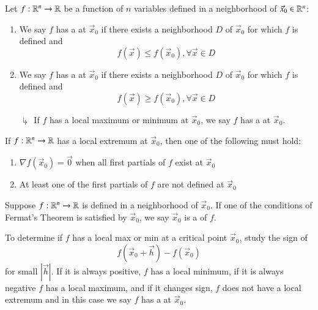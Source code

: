 \begin{appendices}
    \begin{defn}
        Let $f:\mathbb R^n\rightarrow \mathbb R$ be a function of $n$ variables defined in a neighborhood of $\vec{x}_0 \in \mathbb R^n$: \begin{enumerate}
            \item We say $f$ has a  at $\vec{x}_0$ if there exists a neighborhood $D$ of $\vec{x}_0$ for which $f$ is defined and \begin{equation}
                f(\vec{x}) \leq f(\vec{x}_0), \forall \vec{x} \in D
            \end{equation}
            \item We say $f$ has a  at $\vec{x}_0$ if there exists a neighborhood $D$ of $\vec{x}_0$ for which $f$ is defined and \begin{equation}
                f(\vec{x}) \geq f(\vec{x}_0), \forall \vec{x} \in D
            \end{equation}
            \item[$\drsh$] If $f$ has a local maximum or minimum at $\vec{x}_0$, we say $f$ has a  at $\vec{x}_0$.
        \end{enumerate}
    \end{defn}
    
    \begin{thm}[Fermat]
        If $f:\mathbb R^n\rightarrow \mathbb R$ has a local extremum at $\vec{x}_0$, then one of the following must hold:\begin{enumerate}
            \item $\nabla f(\vec{x}_0) = \vec{0}$ when all first partials of $f$ exist at $\vec{x}_0$
            \item At least one of the first partials of $f$ are not defined at $\vec{x}_0$
        \end{enumerate}
    \end{thm}
    
    \begin{defn}
        Suppose $f:\mathbb R^n\rightarrow \mathbb R$ is defined in a neighborhood of $\vec{x}_0$. If one of the conditions of Fermat's Theorem is satisfied by $\vec{x}_0$, we say $\vec{x}_0$ is a  of $f$.
    \end{defn}
    
    \begin{rmk}
        To determine if $f$ has a local max or min at a critical point $\vec{x}_0$, study the sign of \begin{equation}
            f(\vec{x}_0 + \vec{h}) - f(\vec{x}_0)
        \end{equation}
        for small $|\vec{h}|$. If it is always positive, $f$ has a local minimum, if it is always negative $f$ has a local maximum, and if it changes sign, $f$ does not have a local extremum and in this case we say $f$ has a  at $\vec{x}_0$.
    \end{rmk}
    

\end{appendices}
